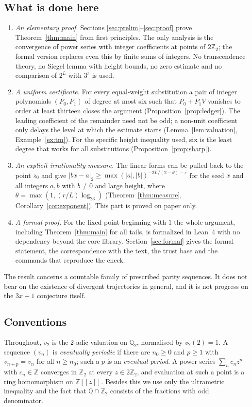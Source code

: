 \documentclass[11pt,reqno]{amsart}
\theoremstyle{definition}
\theoremstyle{remark}
\newcommand{\Z}{\mathbb{Z}}
\newcommand{\Q}{\mathbb{Q}}
\newcommand{\Zt}{\mathbb{Z}_2}
\newcommand{\vt}{v_2}
\begin{document}
\subsection{What is done here}
\begin{enumerate}
\item \emph{An elementary proof.}  Sections
\ref{sec:prelim}--\ref{sec:proof} prove Theorem~\ref{thm:main} from first
principles.  The only analysis is the convergence of power series with
integer coefficients at points of $2\Zt$; the formal version replaces even
this by finite sums of integers.  No transcendence theory, no Siegel lemma
with height bounds, no zero estimate and no comparison of $2^L$ with $3^r$
is used.
\item \emph{A uniform certificate.}  For every equal-weight substitution a
pair of integer polynomials $(P_0,P_1)$ of degree at most six such that
$P_0+P_1V$ vanishes to order at least thirteen closes the argument
(Proposition~\ref{prop:ledger}).  The leading coefficient of the remainder
need not be odd; a non-unit coefficient only delays the level at which
the estimate starts (Lemma~\ref{lem:valuation}, Example~\ref{ex:tm}).  For
the specific height inequality used, six is the least degree that works
for all substitutions (Proposition~\ref{prop:sharp}).
\item \emph{An explicit irrationality measure.}  The linear forms can be
pulled back to the point $z_0$ and give
$|bx-a|_2\ge\max(|a|,|b|)^{-2L/(2-\theta)-\varepsilon}$ for the seed $x$ and
all integers $a,b$ with $b\ne 0$ and large height, where
$\theta=\max(1,(r/L)\log_23)$ (Theorem~\ref{thm:measure},
Corollary~\ref{cor:exponent}).  This part is proved on paper only.
\item \emph{A formal proof.}  For the fixed point beginning with $1$ the
whole argument, including Theorem~\ref{thm:main} for all tails, is
formalized in Lean~4 \cite{Lean4} with no dependency beyond the core
library.  Section~\ref{sec:formal} gives the formal statement, the
correspondence with the text, the trust base and the commands that
reproduce the check.
\end{enumerate}
The result concerns a countable family of prescribed parity sequences.  It
does not bear on the existence of divergent trajectories in general, and
it is not progress on the $3x+1$ conjecture itself.

\subsection{Conventions}
Throughout, $\vt$ is the $2$-adic valuation on $\Q_2$, normalised by
$\vt(2)=1$.  A sequence $(v_n)$ is \emph{eventually periodic} if there are
$n_0\ge 0$ and $p\ge 1$ with $v_{n+p}=v_n$ for all $n\ge n_0$; such a $p$ is
an \emph{eventual period}.  A power series $\sum_n c_nz^n$ with $c_n\in\Z$
converges in $\Zt$ at every $z\in 2\Zt$, and evaluation at such a point is
a ring homomorphism on $\Z[[z]]$.  Besides this we use only the
ultrametric inequality and the fact that $\Q\cap\Zt$ consists of the
fractions with odd denominator.
\end{document}
